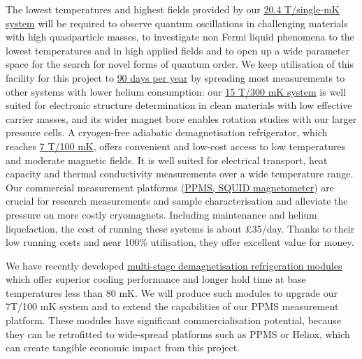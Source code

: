 \documentclass[prl,a4paper,11pt]{revtex4-2}
\begin{document}
\begin{singlespace}
The lowest temperatures and highest fields provided by our \ul{20.4
T/single-mK system} will be required to observe quantum oscillations in challenging
materials with high quasiparticle masses, to investigate non Fermi liquid phenomena to the lowest temperatures and in high applied fields and to open
up a wide parameter space for the search for novel forms of quantum
order. We keep utilisation of this facility for this project to \ul{90 days per year} by spreading most measurements to other systems with lower helium consumption: our \ul{15 T/300 mK system} is well suited for
electronic structure determination in clean materials with low effective carrier
masses, and its wider magnet bore enables rotation
studies with our larger pressure cells. A cryogen-free adiabatic demagnetisation refrigerator, which reaches
\ul{7 T/100 mK}, offers convenient and low-cost access to
low temperatures and moderate magnetic fields. It is well suited for electrical transport, heat
capacity and thermal conductivity measurements over a wide
temperature range.  Our commercial
measurement platforms (\ul{PPMS, SQUID magnetometer}) are crucial for
research measurements and sample characterisation and alleviate the pressure on more costly cryomagnets. Including maintenance and helium liquefaction, the cost of running these systems is about \pounds 35/day.  Thanks to their low running
costs and near 100\% utilisation, they offer excellent value for money.


We have recently developed \ul{multi-stage demagnetisation refrigeration modules} which offer superior cooling performance and longer hold time at base temperatures less than 80 mK. We will produce such modules to upgrade our 7T/100 mK system and to extend the capabilities of our PPMS measurement platform. These modules have significant commercialisation potential, because they can be retrofitted to wide-spread platforms such as PPMS or Heliox, which can create tangible economic impact from this project.




\end{singlespace}
\end{document}
